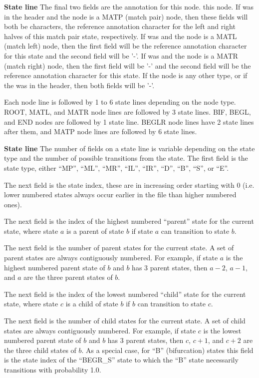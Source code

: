 \begin{sreitems}{\textbf{State line}}
  The final two fields are the  annotation for this node.
  this node. If  was  in the header and the node is
  a MATP (match pair) node, then these fields will both be characters,
  the reference annotation character for the left and right halves of
  this match pair state, respectively. If  was  and
  the node is a MATL (match left) node, then the first field will be
  the reference annotation character for this state and the second field
  will be '-'. If  was  and the node is a MATR
  (match right) node, then the first field will be '-' and the second
  field will be the reference annotation character for this state. If
  the node is any other type, or if the  was  in
  the header, then both fields will be '-'.

  Each node line is followed by 1 to 6 state
  lines depending on the node type. ROOT, MATL, and MATR node lines
  are followed by 3 state lines. BIF, BEGL, and END nodes are followed
  by 1 state line. BEGLR node lines have 2 state lines after them, and
  MATP node lines are followed by 6 state lines. 

\item [\textbf{State line}] 
  The number of fields on a state line is variable depending on the
  state type and the number of possible transitions from the
  state. The first field is the state type, either ``MP'', ``ML'',
  ``MR'', ``IL'', ``IR'', ``D'', ``B'', ``S'', or ``E''.

  The next field is the state index, these are in increasing order
  starting with 0 (i.e. lower numbered states always occur earlier in the
  file than higher numbered ones). 

  The next field is the index of the highest numbered ``parent''
  state for the current state, where state $a$ is a parent of state
  $b$ if state $a$ can transition to state $b$.

  The next field is the number of parent states for the current
  state. A set of parent states are always contiguously numbered. For
  example, if state $a$ is the highest numbered parent state of $b$
  and $b$ has 3 parent states, then $a-2$, $a-1$, and $a$ are the
  three parent states of $b$.

  The next field is the index of the lowest numbered ``child'' state
  for the current state, where state $c$ is a child of state $b$ if
  $b$ can transition to state $c$. 

  The next field is the number of child states for the current
  state. A set of child states are always contiguously numbered. For
  example, if state $c$ is the lowest numbered parent state of $b$ and
  $b$ has 3 parent states, then $c$, $c+1$, and $c+2$ are the three
  child states of $b$. As a special case, for ``B'' (bifurcation) states
  this field is the state index of the ``BEGR\_S'' state to which the
  ``B'' state necessarily transitions with probability 1.0.


\end{sreitems}
